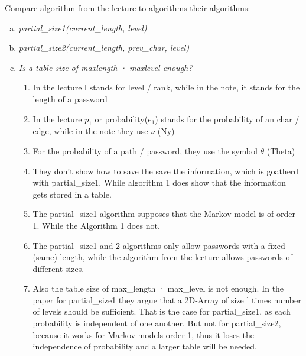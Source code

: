 Compare algorithm from the lecture to algorithms their algorithms:
\begin{enumerate}[(a)]

    \item {\itshape partial\_size1(current\_length, level)}
    
    \item {\itshape partial\_size2(current\_length, prev\_char, level)}
    
    \item {\itshape Is a table size of maxlength · maxlevel enough?}

    \begin{enumerate}[1.]
        \item In the lecture l stands for level / rank, while in the note, it stands for the length of a password
        \item In the lecture $p_1$ or probability($e_1$) stands for the probability of an char / edge, while in the note they use $\nu$ (Ny) 
        \item For the probability of a path / password, they use the symbol $\theta$ (Theta)
        \item They don't show how to save the save the information, which is goatherd with partial\_size1. While algorithm 1 does show that the information gets stored in a table.
        \item The partial\_size1 algorithm supposes that the Markov model is of order 1. While the Algorithm 1 does not.
        \item The partial\_size1 and 2 algorithms only allow passwords with a fixed (same) length, while the algorithm from the lecture allows passwords of different sizes.
        \item Also the table size of max\_length · max\_level is not enough. In the paper for partial\_size1 they argue that a 2D-Array of size l times number of levels should be sufficient. That is the case for partial\_size1, as each probability is independent of one another. But not for partial\_size2, because it works for Markov models order 1, thus it loses the independence of probability and a larger table will be needed.
    \end{enumerate}


\end{enumerate}

